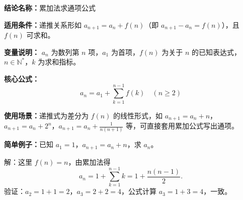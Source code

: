 \textbf{结论名称：}累加法求通项公式

\textbf{适用条件：}递推关系形如 \(a_{n+1}=a_n+f(n)\)（即 \(a_{n+1}-a_n=f(n)\)），且 \(f(n)\) 可求和。

\textbf{变量说明：} \(a_n\) 为数列第 \(n\) 项，\(a_1\) 为首项，\(f(n)\) 为关于 \(n\) 的已知表达式，\(n\in\mathbb{N}^*\)，\(k\) 为求和指标。

\textbf{核心公式：}
\[
\boxed{a_n = a_1 + \sum_{k=1}^{n-1} f(k) \quad (n \geqslant 2)}
\]

\textbf{使用场景：}递推式为差分为 \(f(n)\) 的线性形式，如 \(a_{n+1}=a_n + n\)，\(a_{n+1}=a_n + 2^n\)，\(a_{n+1}=a_n + \frac{1}{n(n+1)}\) 等，可直接套用累加公式写出通项。

\textbf{简单例子：}已知 \(a_1=1\)，\(a_{n+1}=a_n + n\)，求 \(a_n\)。

解：这里 \(f(n)=n\)，由累加法得
\[
a_n = 1 + \sum_{k=1}^{n-1} k = 1 + \frac{n(n-1)}{2}.
\]
验证：\(a_2 = 1+1=2\)，\(a_3 = 2+2=4\)，公式计算 \(a_3 = 1+3=4\)，一致。